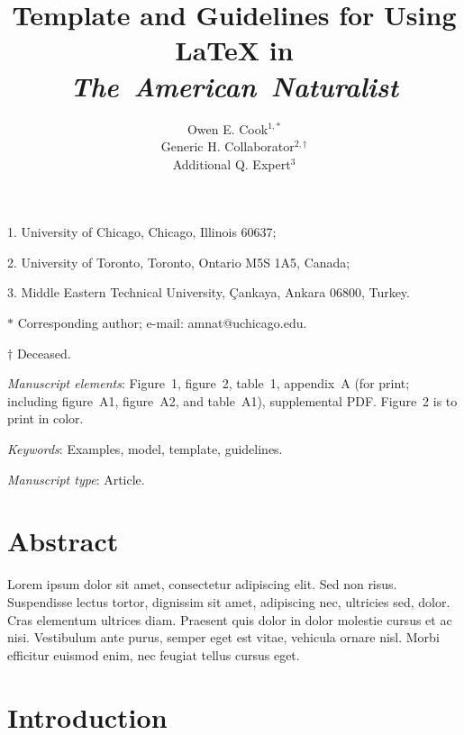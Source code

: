 \documentclass[11pt]{article}
\title{Template and Guidelines for Using \LaTeX{} in \textit{The~American~Naturalist} }
\author{Owen E. Cook$^{1,\ast}$ \\ 
Generic H. Collaborator$^{2,\dag}$ \\ 
Additional Q. Expert$^{3}$}
\date{}
\begin{document}
\maketitle

\noindent{} 1. University of Chicago, Chicago, Illinois 60637;

\noindent{} 2. University of Toronto, Toronto, Ontario M5S 1A5, Canada;

\noindent{} 3. Middle Eastern Technical University, Çankaya, Ankara 06800, Turkey.

\noindent{} $\ast$ Corresponding author; e-mail: amnat@uchicago.edu.

\noindent{} $\dag$ Deceased.

\bigskip

\textit{Manuscript elements}: Figure~1, figure~2, table~1, appendix~A (for print; including figure~A1, figure~A2, and table~A1), supplemental PDF. Figure~2 is to print in color.

\bigskip

\textit{Keywords}: Examples, model, template, guidelines.

\bigskip

\textit{Manuscript type}: Article. %

\bigskip


\linenumbers{}
\modulolinenumbers[1]

\newpage{}

\section*{Abstract}

Lorem ipsum dolor sit amet, consectetur adipiscing elit. Sed non risus. Suspendisse lectus tortor, dignissim sit amet, adipiscing nec, ultricies sed, dolor. Cras elementum ultrices diam. Praesent quis dolor in dolor molestie cursus et ac nisi. Vestibulum ante purus, semper eget est vitae, vehicula ornare nisl. Morbi efficitur euismod enim, nec feugiat tellus cursus eget. 

\newpage{}

\section*{Introduction}
\end{document}
